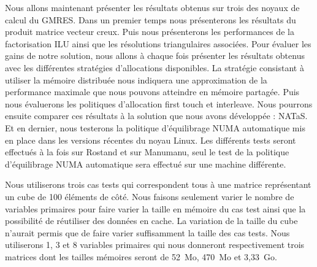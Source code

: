 Nous allons maintenant présenter les résultats obtenus sur trois des noyaux de calcul du GMRES.
%
Dans un premier temps nous présenterons les résultats du produit matrice vecteur creux.
%
Puis nous présenterons les performances de la factorisation ILU ainsi que les résolutions triangulaires associées.
%
Pour évaluer les gains de notre solution, nous allons à chaque fois présenter les résultats obtenus avec les différentes stratégies d'allocations disponibles.
%
La stratégie consistant à utiliser la mémoire distribuée nous indiquera une approximation de la performance maximale que nous pouvons atteindre en mémoire partagée.
%
Puis nous évaluerons les politiques d'allocation first touch et interleave.
%
Nous pourrons ensuite comparer ces résultats à la solution que nous avons développée : NATaS.
%
Et en dernier, nous testerons la politique d'équilibrage NUMA automatique mis en place dans les versions récentes du noyau Linux.
%
Les différents tests seront effectués à la fois sur Rostand et sur Manumanu, seul le test de la politique d'équilibrage NUMA automatique sera effectué sur une machine différente.

Nous utiliserons trois cas tests qui correspondent tous à une matrice représentant un cube de 100 éléments de côté.
%
Nous faisons seulement varier le nombre de variables primaires pour faire varier la taille en mémoire du cas test ainsi que la possibilité de réutiliser des données en cache.
%
La variation de la taille du cube n'aurait permis que de faire varier suffisamment la taille des cas tests.
%
Nous utiliserons 1, 3 et 8 variables primaires qui nous donneront respectivement trois matrices dont les tailles mémoires seront de 52~Mo, 470~Mo et 3,33~Go.
